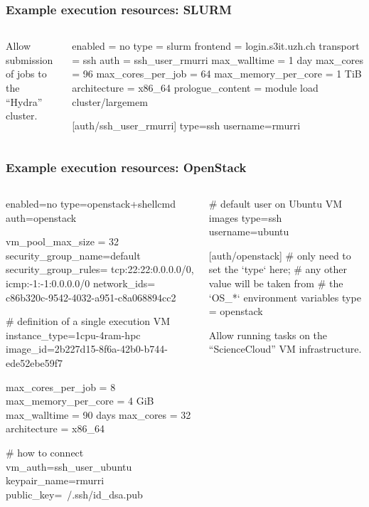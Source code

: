 \documentclass[english,serif,mathserif,xcolor=pdftex,dvipsnames,table]{beamer}
\begin{document}
\begin{frame}[fragile]
  \frametitle{Example execution resources: SLURM}
  \begin{columns}[t]
    \begin{column}{0.5\textwidth}
      Allow submission of jobs to the ``Hydra'' cluster.
    \end{column}
    \begin{column}{0.5\textwidth}
\begin{stdout}
enabled = no
type = slurm
frontend = login.s3it.uzh.ch
transport = ssh
auth = ssh_user_rmurri
max_walltime = 1 day
max_cores = 96
max_cores_per_job = 64
max_memory_per_core = 1 TiB
architecture = x86_64
prologue_content =
  module load cluster/largemem

[auth/ssh_user_rmurri]
type=ssh
username=rmurri
\end{stdout}
    \end{column}
  \end{columns}
\end{frame}


\begin{frame}[fragile]
  \frametitle{Example execution resources: OpenStack}
  \begin{columns}[t]
    \begin{column}{0.5\textwidth}
\begin{stdout}
enabled=no
type=openstack+shellcmd
auth=openstack

vm_pool_max_size = 32
security_group_name=default
security_group_rules=
  tcp:22:22:0.0.0.0/0,
  icmp:-1:-1:0.0.0.0/0
network_ids=
  c86b320c-9542-4032-a951-c8a068894cc2

# definition of a single execution VM
instance_type=1cpu-4ram-hpc
image_id=2b227d15-8f6a-42b0-b744-ede52ebe59f7

max_cores_per_job = 8
max_memory_per_core = 4 GiB
max_walltime = 90 days
max_cores = 32
architecture = x86_64

# how to connect
vm_auth=ssh_user_ubuntu
keypair_name=rmurri
public_key=~/.ssh/id_dsa.pub
\end{stdout}
    \end{column}
    \begin{column}{0.5\textwidth}
      \begin{stdout}
# default user on Ubuntu VM images
type=ssh
username=ubuntu


[auth/openstack]
# only need to set the `type` here;
# any other value will be taken from
# the `OS\_*` environment variables
type = openstack
      \end{stdout}

      \+\+\+
      Allow running tasks on the ``ScienceCloud'' VM infrastructure.

    \end{column}
  \end{columns}
\end{frame}
\end{document}
